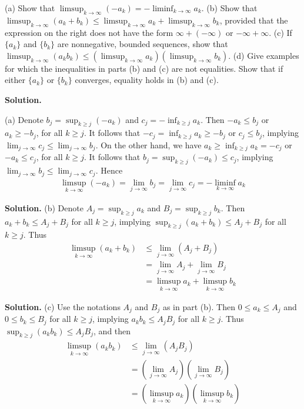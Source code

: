\documentclass[12pt]{article}
\theoremstyle{definition}
\begin{document}
(a) Show that $\limsup_{k\to\infty}(-a_k)=-\liminf_{k\to\infty}a_k$.
(b) Show that $\limsup_{k\to\infty}(a_k+b_k)\le\limsup_{k\to\infty}a_k+\limsup_{k\to\infty}b_k$, provided that the expression on the right does not have the form $\infty+(-\infty)$ or $-\infty+\infty$.
(c) If $\{a_k\}$ and $\{b_k\}$ are nonnegative, bounded sequences, show that $\limsup_{k\to\infty}(a_kb_k)\le\left(\limsup_{k\to\infty}a_k\right)\left(\limsup_{k\to\infty}b_k\right)$.
(d) Give examples for which the inequalities in parts (b) and (c) are not equalities. Show that if either $\{a_k\}$ or $\{b_k\}$ converges, equality holds in (b) and (c).

\smallskip
\noindent\textbf{Solution.}\quad

(a) Denote $b_j=\sup_{k\ge j}(-a_k)$ and $c_j=-\inf_{k\ge j}a_k$. Then $-a_k\le b_j$ or $a_k\ge -b_j$, for all $k\ge j$. It follows that $-c_j=\inf_{k\ge j}a_k\ge -b_j$ or $c_j\le b_j$, implying $\lim_{j\to\infty}c_j\le\lim_{j\to\infty}b_j$. On the other hand, we have $a_k\ge\inf_{k\ge j}a_k=-c_j$ or $-a_k\le c_j$, for all $k\ge j$. It follows that $b_j=\sup_{k\ge j}(-a_k)\le c_j$, implying $\lim_{j\to\infty}b_j\le\lim_{j\to\infty}c_j$. Hence
\begin{align*}
\limsup_{k\to\infty}(-a_k)
=\lim_{j\to\infty}b_j
=\lim_{j\to\infty}c_j
=-\liminf_{k\to\infty}a_k
\end{align*}

\smallskip
\noindent\textbf{Solution.}\quad
(b) Denote $A_j=\sup_{k\ge j}a_k$ and $B_j=\sup_{k\ge j}b_k$. Then $a_k+b_k\le A_j+B_j$ for all $k\ge j$, implying $\sup_{k\ge j}(a_k+b_k)\le A_j+B_j$ for all $k\ge j$. Thus
\begin{align*}
\limsup_{k\to\infty}(a_k+b_k)
&\le\lim_{j\to\infty}(A_j+B_j) \\
&=\lim_{j\to\infty}A_j+\lim_{j\to\infty}B_j \\
&=\limsup_{k\to\infty}a_k+\limsup_{k\to\infty}b_k
\end{align*}

\smallskip
\noindent\textbf{Solution.}\quad
(c) Use the notations $A_j$ and $B_j$ as in part (b). Then $0\le a_k\le A_j$ and $0\le b_k\le B_j$ for all $k\ge j$, implying $a_kb_k\le A_jB_j$ for all $k\ge j$. Thus $\sup_{k\ge j}(a_kb_k)\le A_jB_j$, and then
\begin{align*}
\limsup_{k\to\infty}(a_kb_k)
&\le\lim_{j\to\infty}(A_jB_j) \\
&=\left(\lim_{j\to\infty}A_j\right)\left(\lim_{j\to\infty}B_j\right) \\
&=\left(\limsup_{k\to\infty}a_k\right)\left(\limsup_{k\to\infty}b_k\right)
\end{align*}
\end{document}
